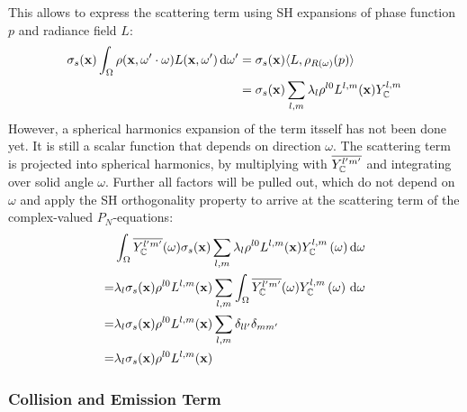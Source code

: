 This allows to express the scattering term using SH expansions of phase function $p$ and radiance field $L$:
\begin{align*}
\sigma_s(\mathbf{x})\int_{\Omega}\rho(\mathbf{x}, \omega'\cdot\omega)L(\mathbf{x}, \omega')\,\mathrm{d}\omega'
&=
\sigma_s(\mathbf{x})\langle L,  \rho_{R(\omega)}(p)\rangle
\\
&=
\sigma_s(\mathbf{x})
\sum_{l,m}
{
\lambda_l
\rho^{l0}L^{l,m}(\mathbf{x})
Y_{\mathbb{C}}^{l,m}
}
\end{align*}
However, a spherical harmonics expansion of the term itsself has not been done yet. It is still a scalar function that depends on direction $\omega$. The scattering term is projected into spherical harmonics, by multiplying with $\overline {Y_{\mathbb{C}}^{l'm'}}$ and integrating over solid angle $\omega$. Further all factors will be pulled out, which do not depend on $\omega$ and apply the SH orthogonality property to arrive at the scattering term of the complex-valued $P_N$-equations:
\begin{align}
&
\int_{\Omega}
{
\overline{Y_{\mathbb{C}}^{l'm'}}(\omega)
\sigma_s(\mathbf{x})
\sum_{l,m}
{
\lambda_l
\rho^{l0}L^{l,m}(\mathbf{x})
Y_{\mathbb{C}}^{l,m}\left(\omega\right)
}
\,\mathrm{d}\omega
}
\nonumber\\
=&
\lambda_l
\sigma_s(\mathbf{x})
\rho^{l0}L^{l,m}(\mathbf{x})
\sum_{l,m}
{
\int_{\Omega}
{
\overline{Y_{\mathbb{C}}^{l'm'}}(\omega)
Y_{\mathbb{C}}^{l,m}\left(\omega\right)
\,\mathrm{d}\omega
}
}
\nonumber\\
=&
\lambda_l
\sigma_s(\mathbf{x})
\rho^{l0}L^{l,m}(\mathbf{x})
\sum_{l,m}
{
\delta_{ll'}\delta_{mm'}
}
\nonumber\\
=&
\lambda_l
\sigma_s(\mathbf{x})
\rho^{l0}L^{l,m}(\mathbf{x})
\label{eq:sh_complex_scattering}
\end{align}



\subsubsection*{Collision and Emission Term}

